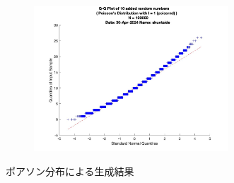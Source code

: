 \begin{figure}
\begin{subfigure}{0.48\linewidth}
		\label{fig:cl-poisson-added}
	\end{subfigure}
	\begin{subfigure}{0.48\linewidth}
		\centering
		\includegraphics[width=0.8\textwidth]{src/figures/cl-poisson/cl_added_poissrnd_qqpl_N=100000.jpg}
		\label{fig:cl-poisson-added-qqpl}
	\end{subfigure}
	\caption{ポアソン分布による生成結果}\label{fig:cl-poisson-random}
\end{figure}
